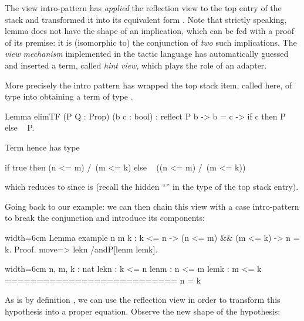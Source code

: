 The view intro-pattern  has \emph{applied} the reflection
view  to
the top entry of the stack  and transformed it into
its equivalent form . Note that strictly
speaking, lemma  does not have the shape of an implication,
which can be fed with a proof of its premise: it is (isomorphic to) the
conjunction of \emph{two} such implications. The \emph{view mechanism}
implemented in the tactic language has automatically guessed and
inserted a term, called \emph{hint view}, which plays the role of an
adapter.

More precisely the  intro pattern has wrapped the top
stack item, called  here, of type  into
 obtaining a term of type
.

\begin{coq}{}{}
Lemma elimTF (P Q : Prop) (b c : bool) :
  reflect P b -> b = c -> if c then P else ~ P.
\end{coq}
Term  hence has type

\begin{coq}{}{}
if true then (n <= m) /\ (m <= k) else ~ ((n <= m) /\ (m <= k))
\end{coq}
which reduces to  since  is 
(recall the hidden ``'' in the type of the top stack entry).

Going back to  our example: we can then chain this view with a case
intro-pattern to break the conjunction and introduce its components:

\begin{coq-left}{}{width=6cm}
Lemma example n m k : k <= n ->
  (n <= m) && (m <= k) -> n = k.
Proof.
move=> lekn /andP[lenm lemk].
$~$
$~$
\end{coq-left}
\begin{coqout-right}{}{width=6cm}
n, m, k : nat
lekn : k <= n
lenm : n <= m
lemk : m <= k
===========================
n = k
\end{coqout-right}

As  is by definition , we can use the
reflection view
 in order to transform this hypothesis into a proper equation.
Observe the new shape of the  hypothesis:

